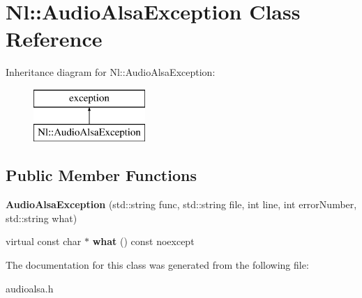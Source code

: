 \hypertarget{classNl_1_1AudioAlsaException}{}\section{Nl\+:\+:Audio\+Alsa\+Exception Class Reference}
\label{classNl_1_1AudioAlsaException}
Inheritance diagram for Nl\+:\+:Audio\+Alsa\+Exception\+:\begin{figure}[H]
\begin{center}
\leavevmode
\includegraphics[height=2.000000cm]{classNl_1_1AudioAlsaException}
\end{center}
\end{figure}
\subsection*{Public Member Functions}
\begin{DoxyCompactItemize}
\item 
\hypertarget{classNl_1_1AudioAlsaException_a6c40dfc626db2587fc521cd9778fbc24}{}{\bfseries Audio\+Alsa\+Exception} (std\+::string func, std\+::string file, int line, int error\+Number, std\+::string what)\label{classNl_1_1AudioAlsaException_a6c40dfc626db2587fc521cd9778fbc24}

\item 
\hypertarget{classNl_1_1AudioAlsaException_a3fdf23855f8f24b2123782564d48bfb7}{}virtual const char $\ast$ {\bfseries what} () const noexcept\label{classNl_1_1AudioAlsaException_a3fdf23855f8f24b2123782564d48bfb7}

\end{DoxyCompactItemize}


The documentation for this class was generated from the following file\+:\begin{DoxyCompactItemize}
\item 
audioalsa.\+h\end{DoxyCompactItemize}
